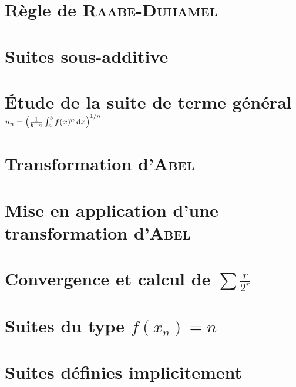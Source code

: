 \section{Règle de \textsc{Raabe-Duhamel}}


\section{Suites sous-additive}


\section{Étude de la suite de terme général \texorpdfstring{$u_n = \left( \frac{1}{b-a} \int_{a}^{b} f(x)^n \, \mathrm{d} x \right)^{1/n}$}{égal à une intégrale}}


\section{Transformation d'\textsc{Abel}} \label{transformation_abel}


\section{Mise en application d'une transformation d'\textsc{Abel}}


\section{Convergence et calcul de  \texorpdfstring{$\sum \frac{r}{2^r}$}{de la série de terme général r/2^r}}


\section{Suites du type \texorpdfstring{$f(x_n) = n$}{f(x_n) = n}}


\section{Suites définies implicitement}

